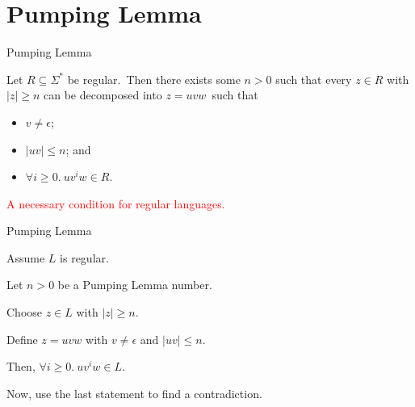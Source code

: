 \documentclass{beamer}
\def\r{\textcolor{red}}
\begin{document}
\section{Pumping Lemma}

\begin{frame}{Pumping Lemma}
    \begin{theorem}
        Let $R \subseteq \Sigma^*$ be regular.\pause\ Then there exists some $n > 0$ such that every $z \in R$ with $|z| \geq n$ can be decomposed into $z = uvw$\pause\ such that
        \begin{itemize}
            \item $v \neq \epsilon$\pause;
            \item $|uv| \leq n$\pause; and
            \item $\forall i \geq 0.\ uv^iw \in R$.
        \end{itemize}
    \end{theorem}\pause
    \r{A necessary condition for regular languages.}
\end{frame}

\begin{frame}{Pumping Lemma}
    \begin{example}
        Assume $L$ is regular.\par
        Let $n > 0$ be a Pumping Lemma number.\pause\par
        Choose $z \in L$ with $|z| \geq n$.\par
        Define $z = uvw$ with $v \neq \epsilon$ and $|uv| \leq n$.\pause\par
        Then, $\forall i \geq 0.\ uv^iw \in L$.\pause\par
        Now, use the last statement to find a contradiction.
    \end{example}
\end{frame}
\end{document}
